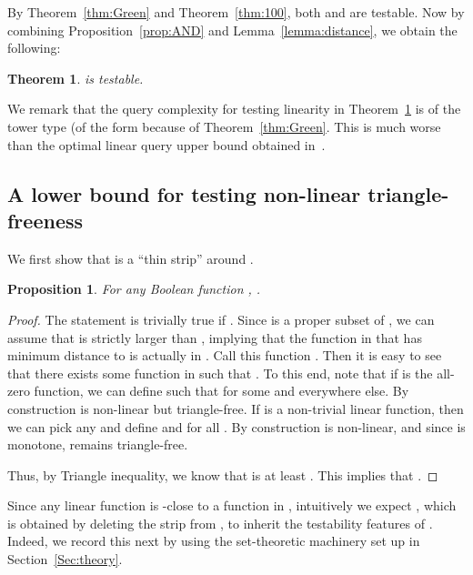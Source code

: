 \documentclass[11pt,english]{article}
\newtheorem{theorem}{Theorem}
\newtheorem{prop}{Proposition}
\theoremstyle{definition}
\theoremstyle{remark}
\begin{document}
By Theorem~\ref{thm:Green} and Theorem~\ref{thm:100}, both 
and  are testable. Now by combining Proposition~\ref{prop:AND}
and Lemma~\ref{lemma:distance}, we obtain the following: 
\begin{theorem}\label{thm:linearity}
 is testable. 
\end{theorem}

We remark that the query complexity for testing linearity in Theorem~\ref{thm:linearity}
is of the tower type (of the form  because of Theorem~\ref{thm:Green}.
This is much worse than the optimal linear query upper bound obtained
in~\cite{BLR93,BCHKS96}.


\subsection{A lower bound for testing non-linear triangle-freeness}
\label{Sec:LB} 
We first show that  is a ``thin strip'' around . 

\begin{prop}\label{prop:thin strip}
For any Boolean function , .
\end{prop}
\begin{proof}
The statement is trivially true if .
Since  is a proper subset of , 
we can assume that  is strictly larger than 
, implying that the function in  that has minimum distance to  is actually 
in . Call this function . 
Then it is easy to see that there exists some function  in  
such that . 
To this end, note that if  is the all-zero function, 
we can define  such that  for some  and  everywhere else. 
By construction  is non-linear but triangle-free. 
If  is a non-trivial linear function, then we can pick any  and define 
 and  for all . 
By construction  is non-linear, and since  is monotone,  remains triangle-free.

Thus, by Triangle inequality, we know that  is at least 
. 
This implies that .
\end{proof}
Since any linear function is -close to a function
in , intuitively we expect , which is obtained by deleting
the strip  from , to inherit the testability features
of . Indeed, we record this next by using the set-theoretic
machinery set up in Section~\ref{Sec:theory}.
\end{document}
